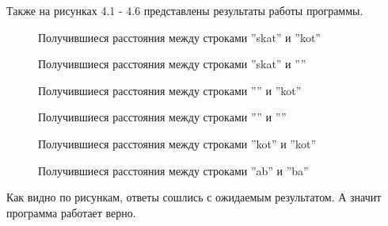 Также на рисунках 4.1 - 4.6 представлены результаты работы программы.
\begin{figure}
	\caption{Получившиеся расстояния между строками ''skat'' и ''kot''}
	\caption{Получившиеся расстояния между строками ''skat'' и ''''}
\end{figure}
\begin{figure}
	\caption{Получившиеся расстояния между строками '''' и ''kot''}
	\caption{Получившиеся расстояния между строками '''' и ''''}
	\caption{Получившиеся расстояния между строками ''kot'' и ''kot''}
	\caption{Получившиеся расстояния между строками ''ab'' и ''ba''}
\end{figure}

\newpage
Как видно по рисункам, ответы сошлись с ожидаемым результатом. А значит программа работает верно.

